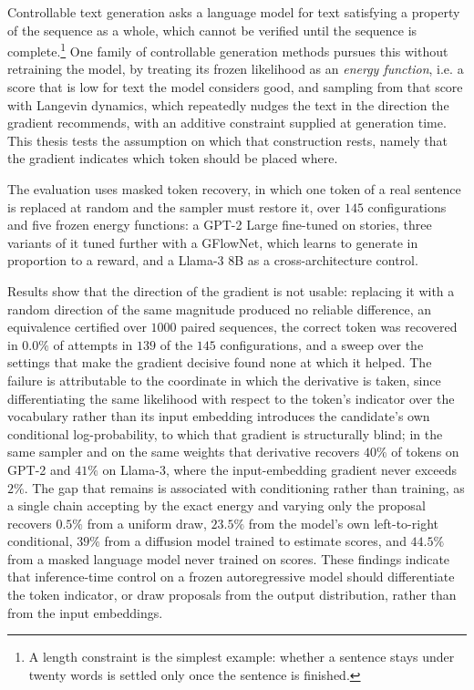 {\renewcommand{\baselinestretch}{1.12}\normalsize
\noindent Controllable text generation asks a language model for text satisfying a property of the sequence as a whole, which cannot be verified until the sequence is complete.\footnote{A length constraint is the simplest example: whether a sentence stays under twenty words is settled only once the sentence is finished.} One family of controllable generation methods pursues this without retraining the model, by treating its frozen likelihood as an \emph{energy function}, i.e. a score that is low for text the model considers good, and sampling from that score with Langevin dynamics, which repeatedly nudges the text in the direction the gradient recommends, with an additive constraint supplied at generation time. This thesis tests the assumption on which that construction rests, namely that the gradient indicates which token should be placed where.

\noindent The evaluation uses masked token recovery, in which one token of a real sentence is replaced at random and the sampler must restore it, over $145$ configurations and five frozen energy functions: a GPT-2 Large fine-tuned on stories, three variants of it tuned further with a GFlowNet, which learns to generate in proportion to a reward, and a Llama-3 8B as a cross-architecture control.

\noindent Results show that the direction of the gradient is not usable: replacing it with a random direction of the same magnitude produced no reliable difference, an equivalence certified over $1000$ paired sequences, the correct token was recovered in $0.0\%$ of attempts in $139$ of the $145$ configurations, and a sweep over the settings that make the gradient decisive found none at which it helped. The failure is attributable to the coordinate in which the derivative is taken, since differentiating the same likelihood with respect to the token's indicator over the vocabulary rather than its input embedding introduces the candidate's own conditional log-probability, to which that gradient is structurally blind; in the same sampler and on the same weights that derivative recovers $40\%$ of tokens on GPT-2 and $41\%$ on Llama-3, where the input-embedding gradient never exceeds $2\%$. The gap that remains is associated with conditioning rather than training, as a single chain accepting by the exact energy and varying only the proposal recovers $0.5\%$ from a uniform draw, $23.5\%$ from the model's own left-to-right conditional, $39\%$ from a diffusion model trained to estimate scores, and $44.5\%$ from a masked language model never trained on scores. These findings indicate that inference-time control on a frozen autoregressive model should differentiate the token indicator, or draw proposals from the output distribution, rather than from the input embeddings.

\par}

\clearpage
